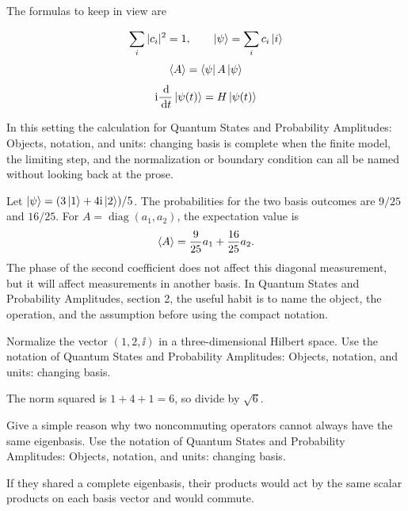 The formulas to keep in view are

\[
  \sum_i |c_i|^2=1,\qquad \left|\psi\right\rangle=\sum_i c_i\left|i\right\rangle
\]
\[
  \left\langle A\right\rangle=\left\langle \psi\right|A\left|\psi\right\rangle
\]
\[
  \mathrm i\frac{\,\mathrm d}{\,\mathrm d t}\left|\psi(t)\right\rangle=H\left|\psi(t)\right\rangle
\]

In this setting the calculation for Quantum States and Probability Amplitudes: Objects, notation, and units: changing basis is complete when the finite model, the limiting step, and the normalization or boundary condition can all be named without looking back at the prose.




\begin{example}
Let \(\left|\psi\right\rangle=(3\left|1\right\rangle+4\mathrm i\left|2\right\rangle)/5\).  The probabilities for the two basis outcomes are \(9/25\) and \(16/25\).  For \(A=\operatorname{diag}(a_1,a_2)\), the expectation value is
\[
  \left\langle A\right\rangle=\frac{9}{25}a_1+\frac{16}{25}a_2.
\]
The phase of the second coefficient does not affect this diagonal measurement, but it will affect measurements in another basis.  In Quantum States and Probability Amplitudes, section 2, the useful habit is to name the object, the operation, and the assumption before using the compact notation.
\end{example}



\begin{exercise}
Normalize the vector \((1,2,\ii)\) in a three-dimensional Hilbert space.  Use the notation of Quantum States and Probability Amplitudes: Objects, notation, and units: changing basis.
\begin{answer}
The norm squared is \(1+4+1=6\), so divide by \(\sqrt6\).
\end{answer}
\end{exercise}

\begin{exercise}
Give a simple reason why two noncommuting operators cannot always have the same eigenbasis.  Use the notation of Quantum States and Probability Amplitudes: Objects, notation, and units: changing basis.
\begin{answer}
If they shared a complete eigenbasis, their products would act by the same scalar products on each basis vector and would commute.
\end{answer}
\end{exercise}



